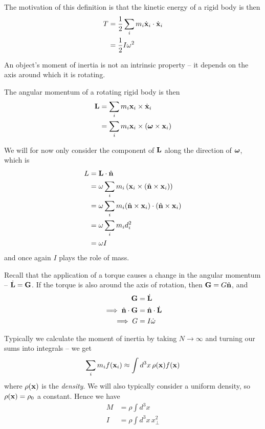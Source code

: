 \documentclass{../../template/note}
\begin{document}
    The motivation of this definition is that the kinetic energy of a rigid body is then
    \begin{align*}
        T &= \frac 1 2 \sum_i m_i \dot{\V x}_i \cdot \dot{\V x}_i \\
        &= \frac 1 2 I \omega^2
    \end{align*}

    \begin{remark*}
        An object's moment of inertia is not an intrinsic property -- it depends on the axis around which it is rotating.
    \end{remark*}

    The angular momentum of a rotating rigid body is then
    \begin{align*}
        \V L &= \sum_i m_i \V x_i \times \dot{\V x}_i \\
        &= \sum_i m_i \V x_i \times (\V \omega \times \V x_i)
    \end{align*}
    
    We will for now only consider the component of \(\V L\) along the direction of \(\V \omega\), which is
    \begin{align*}
        L &= \V L \cdot \hvec n \\
        &= \omega \sum_i m_i \left(\V x_i \times (\hvec n \times \V x_i)\right) \\
        &= \omega \sum_i m_i (\hvec n \times \V x_i) \cdot (\hvec n \times \V x_i) \\
        &= \omega \sum_i m_i d_i^2 \\
        &= \omega I
    \end{align*}
    and once again \(I\) plays the role of mass.

    Recall that the application of a torque causes a change in the angular momentum -- \(\dot{\V L} = \V G\). If the torque is also around the axis of rotation, then \(\V G = G \hvec n\), and
    \begin{align*}
        \V G &= \dot{\V L} \\
        \implies \hvec n \cdot \V G &= \hvec n \cdot \dot{\V L} \\
        \implies G &= I \dot{\omega}
    \end{align*}
    
    Typically we calculate the moment of inertia by taking \(N \to \infty\) and turning our sums into integrals -- we get
    \begin{align*}
        \sum_i m_i f(\V x_i) \approx \int d^3x \, \rho(\V x) f(\V x)
    \end{align*}
    where \(\rho(\V x)\) is the \emph{density}. We will also typically consider a uniform density, so \(\rho(\V x) = \rho_0\) a constant. Hence we have
    \begin{align*}
        M &= \rho \int d^3x \, \\
        I &= \rho \int d^3x \, x_\perp^2
    \end{align*}
    
\end{document}
